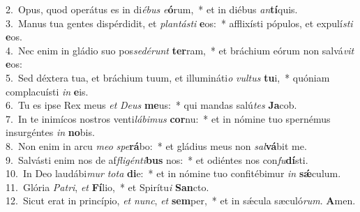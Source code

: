 {2.~}Opus, quod operátus es in di\textit{é}\textit{bus} \textit{e}\textbf{ó}rum,~* et in diébus \textit{an}\textbf{tí}quis.\\
{3.~}Manus tua gentes dispérdidit, et \textit{plan}\textit{tá}\textit{sti} \textbf{e}os:~* afflixísti pópulos, et expulí\textit{sti} \textbf{e}os.\\
{4.~}Nec enim in gládio suo pos\textit{se}\textit{dé}\textit{runt} \textbf{ter}ram,~* et bráchium eórum non salvá\textit{vit} \textbf{e}os:\\
{5.~}Sed déxtera tua, et bráchium tuum, et illumináti\textit{o} \textit{vul}\textit{tus} \textbf{tu}i,~* quóniam complacuísti \textit{in} \textbf{e}is.\\
{6.~}Tu es ipse Rex meus \textit{et} \textit{De}\textit{us} \textbf{me}us:~* qui mandas salú\textit{tes} \textbf{Ja}cob.\\
{7.~}In te inimícos nostros venti\textit{lá}\textit{bi}\textit{mus} \textbf{cor}nu:~* et in nómine tuo spernémus insurgéntes \textit{in} \textbf{no}bis.\\
{8.~}Non enim in arcu \textit{me}\textit{o} \textit{spe}\textbf{rá}bo:~* et gládius meus non \textit{sal}\textbf{vá}bit me.\\
{9.~}Salvásti enim nos de af\textit{fli}\textit{gén}\textit{ti}\textbf{bus} nos:~* et odiéntes nos con\textit{fu}\textbf{dí}sti.\\
{10.~}In Deo laudábi\textit{mur} \textit{to}\textit{ta} \textbf{di}e:~* et in nómine tuo confitébimur \textit{in} \textbf{sǽ}culum.\\
{11.~}Glória \textit{Pa}\textit{tri}, \textit{et} \textbf{Fí}lio,~* et Spirítu\textit{i} \textbf{San}cto.\\
{12.~}Sicut erat in princípio, \textit{et} \textit{nunc}, \textit{et} \textbf{sem}per,~* et in sǽcula sæculó\textit{rum}. \textbf{A}men.\\
